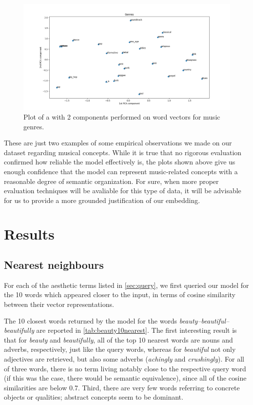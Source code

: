 \begin{figure}[tp]
	\myfloatalign
	\includegraphics[angle=-90,origin=c,width=\linewidth]{gfx/genres}
	\caption[ plot of music genres words]{Plot of a  with 2 components performed on word vectors for music genres.}
	\label{fig:genres}
\end{figure}

These are just two examples of some empirical observations we made on our dataset regarding musical concepts. While it is true that no rigorous evaluation confirmed how reliable the model effectively is, the plots shown above give us enough confidence that the model can represent music-related concepts with a reasonable degree of semantic organization. For sure, when more proper evaluation techniques will be avaliable for this type of data, it will be advisable for us to provide a more grounded justification of our embedding.

\section{Results}
\subsection{Nearest neighbours}\label{subsec:nearest}
For each of the aesthetic terms listed in \autoref{sec:query}, we first queried our model for the 10 words which appeared closer to the input, in terms of cosine similarity between their vector representations. 

The 10 closest words returned by the model for the words \emph{beauty--beautiful--beautifully} are reported in \autoref{tab:beauty10nearest}. The first interesting result is that for \emph{beauty} and \emph{beautifully}, all of the top 10 nearest words are nouns and adverbs, respectively, just like the query words, whereas for \emph{beautiful} not only adjectives are retrieved, but also some adverbs (\emph{achingly} and \emph{crushingly}). For all of three words, there is no term living notably close to the respective query word (if this was the case, there would be semantic equivalence), since all of the cosine similarities are below 0.7. Third, there are very few words referring to concrete objects or qualities; abstract concepts seem to be dominant.

